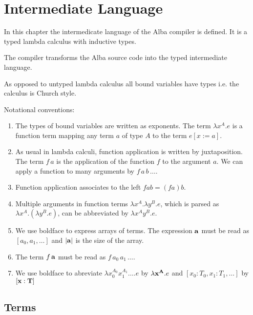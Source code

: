 \section{Intermediate Language}
\label{sec:lang-intermediate-language}

In this chapter the intermedicate language of the Alba compiler is defined. It
is a typed lambda calculus with inductive types.

The compiler transforms the Alba source code into the typed intermediate
language.

As opposed to untyped lambda calculus all bound variables have types i.e. the
calculus is Church style.

Notational conventions:
\begin{enumerate}
\item The types of bound variables are written as exponents. The term
  $\lambda x^A. e$ is a function term mapping any term $a$ of type $A$ to the
  term $e[x:=a]$.

\item As usual in lambda calculi, function application is written by
  juxtaposition. The term $f\,a$ is the application of the function $f$ to the
  argument $a$. We can apply a function to many arguments by $f \, a \, b \,
  \ldots$.

\item Function application associates to the left $f a b = (f a) b$.

\item Multiple arguments in function terms $\lambda x^A. \lambda y^B . e$,
  which is parsed as $\lambda x^A. (\lambda y^B . e)$, can be abbreviated by
  $\lambda x^A y^B. e$.

\item We use boldface to express arrays of terms. The expression $\mathbf{a}$ must
  be read as $[a_0, a_1, \ldots]$ and $|\mathbf{a}|$ is the size of the array.

\item The term $f \, \mathbf{a}$ must be read as $f \, a_0 \, a_1 \, \ldots$.

\item We use boldface to abreviate $\lambda x_0^{A_0} x_1^{A_1} \ldots . e$ by
  $\lambda \mathbf{x}^{\mathbf{A}}. e$ and $[x_0: T_0, x_1:T_1, \ldots]$ by $[\mathbf{x}: \mathbf{T}]$
\end{enumerate}







\subsection{Terms}
\label{sec:terms}


